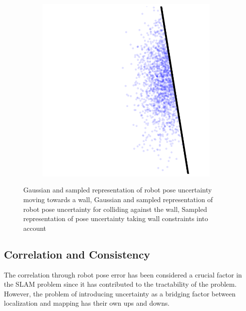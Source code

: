 \begin{figure}
\begin{subfigure}{0.3\textwidth}
\caption{}
\label{wall_robotb}
\end{subfigure}
\begin{subfigure}{0.3\textwidth}
\centering
\includegraphics[scale=0.25]{./images/wall_robotp.png}
\caption{}
\label{wall_robotc}
\end{subfigure}
\caption[Gaussian and particle representation of robot pose distribution]{ Gaussian and sampled representation of robot pose uncertainty moving towards a wall,  Gaussian and sampled representation of robot pose uncertainty for colliding against the wall,  Sampled representation of pose uncertainty taking wall constraints into account}
\label{robot_wall}
\end{figure} 

\subsection{Correlation and Consistency} \label{sec::conscorr}
The correlation through robot pose error has been considered a crucial factor in the SLAM problem since it has contributed to the tractability of the problem. However, the problem of introducing uncertainty as a bridging factor between localization and mapping has their own ups and downs. 

